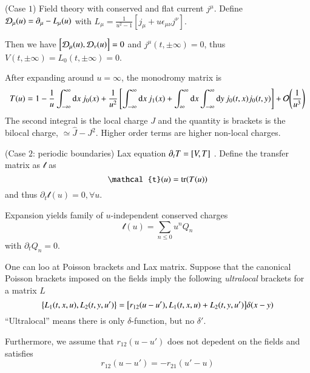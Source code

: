 \begin{example} (Case $1$) 
	Field theory with conserved and flat current $j^\mu$. Define $\mathcal{D}_\mu(u) =  \partial_\mu - L_\mu (u)$ with $L_\mu = \frac{1}{u^2 - 1} \left[ j_\mu + u \epsilon_{\mu\nu} j^\nu \right] $.

	Then we have $\comm{\D_\mu (u)}{\D_\nu (u)} = 0$ and $j^\mu ( t, \pm \infty) = 0$, thus $V(t, \pm \infty) = L_0 (t, \pm \infty) = 0$.

	After expanding around $u=\infty$, the monodromy matrix is 
	\begin{equation}
		T(u) = 1 - \frac{1}{u} \int_{-\infty}^{\infty} \dd{x} j_0 (x) + \frac{1}{u^2} \left[ \int_{-\infty}^{\infty} \dd{x} j_1 (x) + \int_{\infty}^{\infty} \dd{x} \int_{-\infty}^{\infty} \dd{y} j_0(t, x) j_0 (t, y) \right]  + \order{\frac{1}{u^3}}
	\end{equation}
	The second integral is the local charge $J$ and the quantity is brackets is the bilocal charge, $\simeq \hat{J} - J^2$. Higher order terms are higher non-local charges.
\end{example}


\begin{example} (Case $2$: periodic boundaries)
	Lax equation $\partial_t T = \comm{V}{T}$	. Define the transfer matrix as $\mathcal{t}$ as 
	\begin{equation}
		\mathcal{t}(u) = \tr(T(u))
		\label{math:5.5}
	\end{equation}
	and thus $\partial_t \mathcal{t} (u) = 0, \forall u$.

	Expansion yields family of $u$-independent conserved charges
	\begin{equation}
		\mathcal{t}(u) = \sum_{n \leq 0} u^n Q_n
	\end{equation}
	with $\partial_t Q_n = 0$.

	One can loo at Poisson brackets and Lax matrix. Suppose that the canonical Poisson brackets imposed on the fields imply the following \textit{ultralocal} brackets for a matrix $L$
	\begin{equation}
		\pb{L_1(t, x, u)}{L_2 (t, y, u')} = \comm{r_{12}(u-u')}{L_1(t, x, u) + L_2 (t, y, u')} \delta(x-y)
		\label{math:5.6}
	\end{equation}
	``Ultralocal'' means there is only $\delta$-function, but no $\delta '$.

	Furthermore, we assume that $r_{12}(u - u')$ does not depedent on the fields and satisfies 
	\begin{equation}
		r_{12}(u - u') = - r_{21} (u' - u)
	\end{equation}
\end{example}

